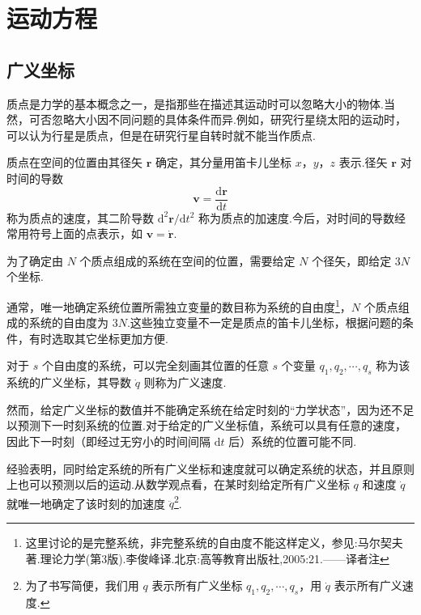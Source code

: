 \chapter{运动方程}

\section{广义坐标}

质点是力学的基本概念之一，是指那些在描述其运动时可以忽略大小的物体.当然，可否忽略大小因不同问题的具体条件而异.例如，研究行星绕太阳的运动时，可以认为行星是质点，但是在研究行星自转时就不能当作质点.

质点在空间的位置由其径矢 $\boldsymbol{r}$ 确定，其分量用笛卡儿坐标 $x$，$y$，$z$ 表示.径矢 $\boldsymbol{r}$ 对时间的导数
\begin{equation}
  \boldsymbol{v} = \frac{\mathrm{d}\boldsymbol{r}}{\mathrm{d}t}
\end{equation}
称为质点的速度，其二阶导数 $\mathrm{d}^2\boldsymbol{r}/\mathrm{d}t^2$ 称为质点的加速度.今后，对时间的导数经常用符号上面的点表示，如 $\boldsymbol{v}=\dot{\boldsymbol{r}}$.

为了确定由 $N$ 个质点组成的系统在空间的位置，需要给定 $N$ 个径矢，即给定 $3N$ 个坐标.

通常，唯一地确定系统位置所需独立变量的数目称为系统的自由度\footnote{这里讨论的是完整系统，非完整系统的自由度不能这样定义，参见:马尔契夫著.理论力学(第3版).李俊峰译.北京:高等教育出版社,2005:21.——译者注}，$N$ 个质点组成的系统的自由度为 $3N$.这些独立变量不一定是质点的笛卡儿坐标，根据问题的条件，有时选取其它坐标更加方便.

对于 $s$ 个自由度的系统，可以完全刻画其位置的任意 $s$ 个变量 $q_1,q_2,\cdots,q_s$ 称为该系统的广义坐标，其导数 $\dot{q}$ 则称为广义速度.

然而，给定广义坐标的数值并不能确定系统在给定时刻的“力学状态”，因为还不足以预测下一时刻系统的位置.对于给定的广义坐标值，系统可以具有任意的速度，因此下一时刻（即经过无穷小的时间间隔 $\mathrm{d}t$ 后）系统的位置可能不同.

经验表明，同时给定系统的所有广义坐标和速度就可以确定系统的状态，并且原则上也可以预测以后的运动.从数学观点看，在某时刻给定所有广义坐标 $q$ 和速度 $\dot{q}$ 就唯一地确定了该时刻的加速度 $\ddot{q}$\footnote{为了书写简便，我们用 $q$ 表示所有广义坐标 $q_1,q_2,\cdots,q_s$，用 $\dot{q}$ 表示所有广义速度.}.

